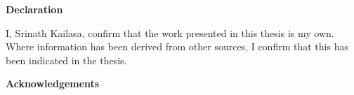 \thispagestyle{plain}

\begin{center}
    \textbf{Declaration}
\end{center}
I, Srinath Kailasa, confirm that the work presented in this thesis is my own. Where information has been derived from other
sources, I confirm that this has been indicated in the thesis.


\begin{center}
    \textbf{Acknowledgements}
\end{center}
